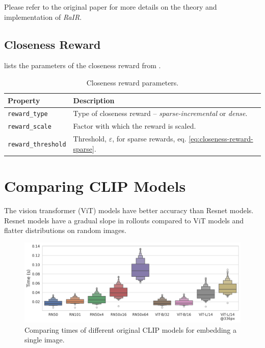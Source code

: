 Please refer to the original paper for more details on the theory and implementation of \emph{RaIR}.

\section{Closeness Reward}
\label{sec:closeness-reward-details}

 lists the parameters of the closeness reward from .
\begin{table}[H]
    \centering
    \begin{tabularx}{\textwidth}{C{3.9cm} L}
        \hline
        Property & Description\\
        \hline
        \texttt{reward\_type} & Type of closeness reward -- \emph{sparse-incremental} or \emph{dense}.\\
        \texttt{reward\_scale} & Factor with which the reward is scaled.\\
        \texttt{reward\_threshold} & Threshold, \(\varepsilon\), for sparse rewards, eq. \eqref{eq:closeness-reward-sparse}.\\
        \hline
    \end{tabularx}
    \caption{Closeness reward parameters.}
    \label{tab:closeness-reward-params}
\end{table}


\chapter{Comparing CLIP Models}
\label{sec:clip-comparison}

The vision transformer (ViT) models have better accuracy than Resnet models.
Resnet models have a gradual slope in rollouts compared to ViT models and flatter distributions on random images.

\begin{figure}[h]
    \centering
    \includegraphics[width=\textwidth]{images/clip_inference_times.png}
    \caption{Comparing times of different original CLIP models for embedding a single image.}
    \label{fig:clip-comparison}
\end{figure}


